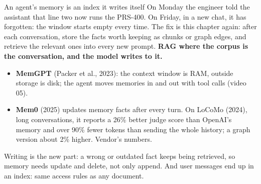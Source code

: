 \documentclass[aspectratio=169]{beamer}
\newcommand{\watchbox}[1]{%
  \begin{tcolorbox}[colback=armorange!12, colframe=armorange, boxrule=0.6pt, arc=2pt]
  #1
  \end{tcolorbox}}
\begin{document}
\begin{frame}{An agent's memory is an index it writes itself}
  \vspace{0.1em}
  {\small On Monday the engineer told the assistant that line two now runs the PRS-400. On Friday,
  in a new chat, it has forgotten: the window starts empty every time. The fix is this chapter
  again: after each conversation, store the facts worth keeping as chunks or graph edges, and
  retrieve the relevant ones into every new prompt. \textbf{RAG where the corpus is the
  conversation, and the model writes to it.}}

  \vspace{0.1em}
  \begin{itemize}\setlength{\itemsep}{1pt}\small
    \item \textbf{MemGPT} (Packer et al., 2023): the context window is RAM, outside storage is disk;
      the agent moves memories in and out with tool calls (video 05).
    \item \textbf{Mem0} (2025) updates memory facts after every turn. On LoCoMo (2024), long
      conversations, it reports a 26\% better judge score than OpenAI's memory and over 90\% fewer
      tokens than sending the whole history; a graph version about 2\% higher. Vendor's numbers.
  \end{itemize}

  \vspace{0.1em}
  \watchbox{\small Writing is the new part: a wrong or outdated fact keeps being retrieved, so
  memory needs update and delete, not only append. And user messages end up in an index: same
  access rules as any document.}
\end{frame}
\end{document}
